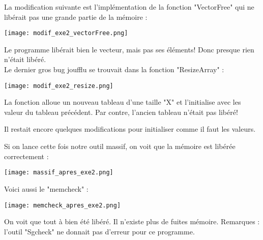 La modification suivante est l'implémentation de la fonction "VectorFree" qui ne libérait pas une grande partie de la mémoire :
\begin{center} 
\hspace{15cm}
\texttt{[image: modif\_exe2\_vectorFree.png]}
\end{center}
\vspace{0.5cm}
Le programme libérait bien le vecteur, mais pas ses éléments! Donc presque rien n'était libéré.\\

Le dernier gros bug joufflu se trouvait dans la fonction "ResizeArray"  :
\begin{center} 
\hspace{15cm}
\texttt{[image: modif\_exe2\_resize.png]}
\end{center}
\vspace{0.5cm}
La fonction alloue un nouveau tableau d'une taille "X" et l'initialise avec les valeur du tableau précédent. Par contre, l'ancien tableau n'était pas libéré!

Il restait encore quelques modifications pour initialiser comme il faut les valeurs. 

\pagebreak 
Si on lance cette fois notre outil massif, on voit que la mémoire est libérée correctement : 
\begin{center} 
\hspace{15cm}
\texttt{[image: massif\_apres\_exe2.png]}
\end{center}
\vspace{0.5cm}

Voici aussi le "memcheck" : 
\begin{center} 
\hspace{15cm}
\texttt{[image: memcheck\_apres\_exe2.png]}
\end{center}
\vspace{0.5cm}
On voit que tout à bien été libéré. Il n'existe plus de fuites mémoire. Remarques :  l'outil "Sgcheck" ne donnait pas d'erreur pour ce programme.


